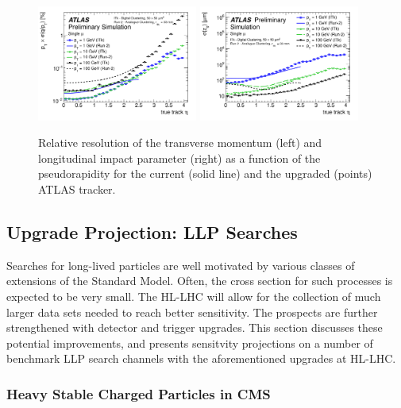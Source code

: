 \begin{figure}[h!tbp]
\begin{center}
  \includegraphics[width=0.47\textwidth]{figures/ch03_fig_006e.png}
  \includegraphics[width=0.47\textwidth]{figures/ch03_fig_006b.png}
  \caption{ Relative resolution of the transverse momentum (left) and longitudinal impact parameter (right) as a function of the pseudorapidity for the current (solid line) and the upgraded (points) ATLAS tracker. 
 }
  \label{fig:atlastrackres}
\end{center}
\end{figure}



\subsection{Upgrade Projection: LLP Searches} \label{sec:upgradesearch}

Searches for long-lived particles are well motivated by various classes of extensions of the Standard Model. 
Often, the cross section for such processes is expected to be very small. The HL-LHC will allow for the collection of much larger data sets needed to reach better sensitivity. 
The prospects are further strengthened with detector and trigger upgrades. 
This section discusses these potential improvements, and presents sensitvity projections on a number of benchmark LLP search channels with the aforementioned upgrades at HL-LHC. 

\subsubsection{Heavy Stable Charged Particles in CMS}

